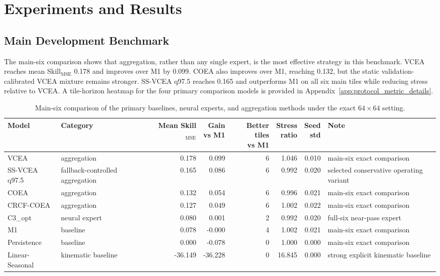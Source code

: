 \documentclass[lettersize,journal]{IEEEtran}
\newcommand{\skillmse}{Skill$_{\mathrm{MSE}}$}
\begin{document}
\section{Experiments and Results}
\subsection{Main Development Benchmark}
The main-six comparison shows that aggregation, rather than any single expert, is the most effective strategy in this benchmark. VCEA reaches mean \skillmse{} 0.178 and improves over M1 by 0.099. COEA also improves over M1, reaching 0.132, but the static validation-calibrated VCEA mixture remains stronger. SS-VCEA q97.5 reaches 0.165 and outperforms M1 on all six main tiles while reducing stress relative to VCEA. A tile-horizon heatmap for the four primary comparison models is provided in Appendix~\ref{app:protocol_metric_details}.

\begin{table}[!t]
  \centering
  \caption{Main-six comparison of the primary baselines, neural experts, and aggregation methods under the exact $64\times64$ setting.}
  \label{tab:table06}
  \scriptsize
  \begin{adjustbox}{max width=\textwidth}
  \begin{tabular}{llrrrrrp{}}
    \toprule
    Model & Category & \shortstack{Mean\\Skill$_{\mathrm{MSE}}$} & \shortstack{Gain\\vs M1} & \shortstack{Better tiles\\vs M1} & \shortstack{Stress\\ratio} & \shortstack{Seed\\std} & Note \\
    \midrule
    VCEA & aggregation & 0.178 & 0.099 & 6 & 1.046 & 0.010 & main-six exact comparison \\
    SS-VCEA q97.5 & fallback-controlled aggregation & 0.165 & 0.086 & 6 & 0.992 & 0.020 & selected conservative operating variant \\
    COEA & aggregation & 0.132 & 0.054 & 6 & 0.996 & 0.021 & main-six exact comparison \\
    CRCF-COEA & aggregation & 0.127 & 0.049 & 6 & 1.002 & 0.022 & main-six exact comparison \\
    C3\_opt & neural expert & 0.080 & 0.001 & 2 & 0.992 & 0.020 & full-six near-pass expert \\
    M1 & baseline & 0.078 & -0.000 & 4 & 1.002 & 0.021 & main-six exact comparison \\
    Persistence & baseline & 0.000 & -0.078 & 0 & 1.000 & 0.000 & main-six exact comparison \\
    Linear-Seasonal & kinematic baseline & -36.149 & -36.228 & 0 & 16.845 & 0.000 & strong explicit kinematic baseline \\
    \bottomrule
  \end{tabular}
  \end{adjustbox}
\end{table}
\end{document}
